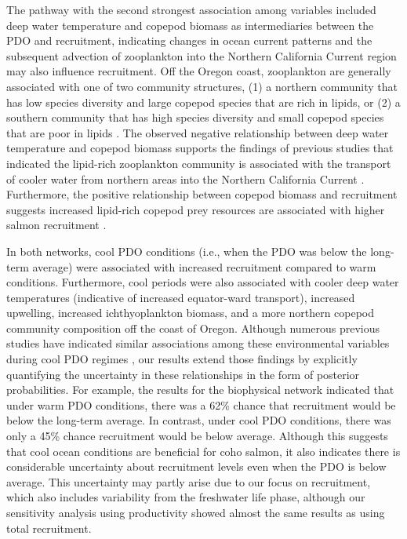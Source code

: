 The pathway with the second strongest association among variables included deep
water temperature and copepod biomass as intermediaries between the PDO and
recruitment, indicating changes in ocean current patterns and the subsequent
advection of zooplankton into the Northern California Current region may also
influence recruitment. Off the Oregon coast, zooplankton are generally
associated with one of two community structures, (1) a northern community that
has low species diversity and large copepod species that are rich in lipids, or
(2) a southern community that has high species diversity and small copepod
species that are poor in lipids \citep{Hooff2006a}. The observed negative
relationship between deep water temperature and copepod biomass supports the
findings of previous studies that indicated the lipid-rich zooplankton community
is associated with the transport of cooler water from northern areas into the
Northern California Current \citep{Keister2011a}. Furthermore, the positive
relationship between copepod biomass and recruitment suggests increased
lipid-rich copepod prey resources are associated with higher salmon recruitment
\citep{Bi2011a}.

In both networks, cool PDO conditions (i.e., when the PDO was below the
long-term average) were associated with increased recruitment compared to warm
conditions. Furthermore, cool periods were also associated with cooler deep
water temperatures (indicative of increased equator-ward transport), increased
upwelling, increased ichthyoplankton biomass, and a more northern copepod
community composition off the coast of Oregon.  Although numerous previous
studies have indicated similar associations among these environmental variables
during cool PDO regimes \citep{King2011, Peterson2003b, Keister2011a,
Mantua1997a}, our results extend those findings by explicitly quantifying the
uncertainty in these relationships in the form of posterior probabilities. For
example, the results for the biophysical network indicated that under warm PDO
conditions, there was a 62\% chance that recruitment would be below the
long-term average. In contrast, under cool PDO conditions, there was only a 45\%
chance recruitment would be below average. Although this suggests that cool
ocean conditions are beneficial for coho salmon, it also indicates there is
considerable uncertainty about recruitment levels even when the PDO is below
average. This uncertainty may partly arise due to our focus on recruitment,
which also includes variability from the freshwater life phase, although our
sensitivity analysis using productivity showed almost the same results as using
total recruitment.

